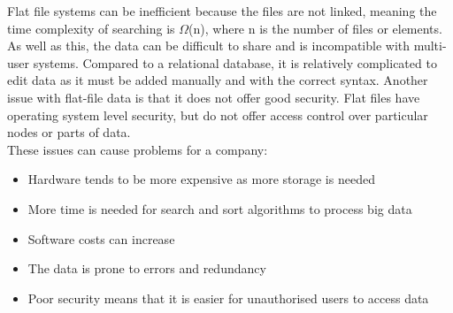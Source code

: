 \documentclass[12pt]{article}
\begin{document}
Flat file systems can be inefficient because the files are not linked, meaning the time complexity of searching is $\Omega$(n), where n is the number of files or elements. As well as this, the data can be difficult to share and is incompatible with multi-user systems. Compared to a relational database, it is relatively complicated to edit data as it must be added manually and with the correct syntax. Another issue with flat-file data is that it does not offer good security. Flat files have operating system level security, but do not offer access control over particular nodes or parts of data. \\

These issues can cause problems for a company: 
\begin{itemize}
\item 
Hardware tends to be more expensive as more storage is needed
\item
More time is needed for search and sort algorithms to process big data
\item
Software costs can increase
\item
The data is prone to errors and redundancy
\item 
Poor security means that it is easier for unauthorised users to access data
\end{itemize}
\end{document}
